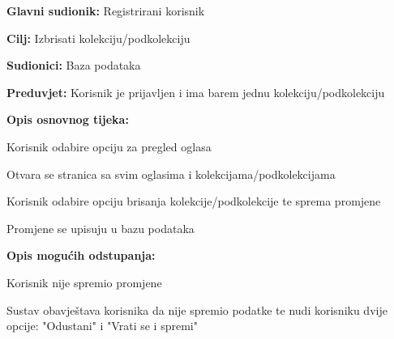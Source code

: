 				\noindent {}
					\begin{packed_item}
	
						\item \textbf{Glavni sudionik: }Registrirani korisnik
						\item  \textbf{Cilj:} Izbrisati kolekciju/podkolekciju
						\item  \textbf{Sudionici:} Baza podataka
						\item  \textbf{Preduvjet:} Korisnik je prijavljen i ima barem jednu kolekciju/podkolekciju
						\item  \textbf{Opis osnovnog tijeka:}
						
						\item[] \begin{packed_enum}
	
							\item Korisnik odabire opciju za pregled oglasa
							\item Otvara se stranica sa svim oglasima i kolekcijama/podkolekcijama
							\item Korisnik odabire opciju brisanja kolekcije/podkolekcije te sprema promjene
							\item Promjene se upisuju u bazu podataka

						\end{packed_enum}	
						
						\item  \textbf{Opis mogućih odstupanja:}
						
						\item[] \begin{packed_item}
	
							\item[3.a] Korisnik nije spremio promjene
								\begin{packed_item}
									\item Sustav obavještava korisnika da nije spremio podatke te nudi korisniku dvije opcije: "Odustani" i "Vrati se i spremi"
								\end{packed_item}
								
						\end{packed_item}					
					\end{packed_item}
					
